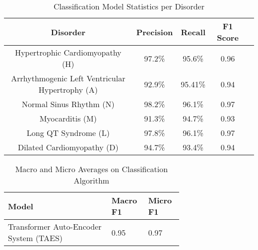 \documentclass[
	a4paper, 
	10pt, 
	twoside, 
]{LTJournalArticle}
\begin{document}
\begin{table*}[ht]
	\caption{Classification Model Statistics per Disorder}
        \label{tab:classmodel}
	\centering %
        \small
	\begin{tabular}{@{}ccccc@{}}
		\toprule
		\cmidrule(r){2-4}
		Disorder & Precision & Recall & F1 Score  \\
		\midrule
		Hypertrophic Cardiomyopathy (H) & 97.2\% & 95.6\% & 0.96 \\
		Arrhythmogenic Left Ventricular Hypertrophy (A) & 92.9\% & 95.41\% & 0.94 \\
		Normal Sinus Rhythm (N) & 98.2\% & 96.1\% & 0.97 \\
            Myocarditis (M) & 91.3\% & 94.7\% & 0.93\\
            Long QT Syndrome (L) & 97.8\% & 96.1\% & 0.97\\
            Dilated Cardiomyopathy (D) & 94.7\% & 93.4\% & 0.94\\
		\bottomrule
	\end{tabular}
\end{table*}
\begin{table*}[!h]
	\caption{Macro and Micro Averages on Classification Algorithm}
        \label{tab:macmic}
	\centering 
        \small
	\begin{tabular}{L{0.5\linewidth} L{0.1\linewidth} L{0.1\linewidth}} 
		\toprule
		Model & Macro F1 & Micro F1 \\
		\midrule
		Transformer Auto-Encoder System (TAES) & 0.95 & 0.97\\
		\bottomrule
	\end{tabular}
\end{table*}
\end{document}
